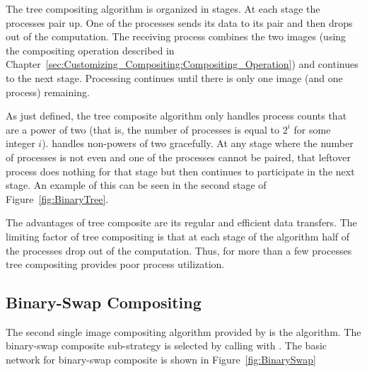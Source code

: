 The tree compositing algorithm is organized in stages.  At each stage the
processes pair up.  One of the processes sends its data to its pair and
then drops out of the computation.  The receiving process combines the two
images (using the compositing operation
described in
Chapter~\ref{sec:Customizing_Compositing:Compositing_Operation}) and
continues to the next stage.  Processing continues until there is only one
image (and one process) remaining.

As just defined, the tree composite algorithm only handles process counts
that are a power of two (that is, the number of processes is equal to $2^i$
for some integer $i$).  \IceT handles non-powers of two gracefully.  At any
stage where the number of processes is not even and one of the processes
cannot be paired, that leftover process does nothing for that stage but
then continues to participate in the next stage.  An example of this can be
seen in the second stage of Figure~\ref{fig:BinaryTree}.

The advantages of tree composite are its regular and efficient data
transfers.  The limiting factor of tree compositing is that at each stage
of the algorithm half of the processes drop out of the computation.  Thus,
for more than a few processes tree compositing provides poor process
utilization.


\subsection{Binary-Swap Compositing}


The second single image compositing algorithm provided by \IceT is the
 algorithm.  The binary-swap composite sub-strategy is
selected by calling  with
.  The basic network for
binary-swap composite is shown in Figure~\ref{fig:BinarySwap}

